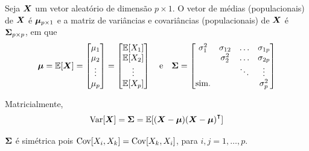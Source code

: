 \begin{definition}
	Seja $\bm{X}$ um vetor aleatório de dimensão $p\times 1$.
	O vetor de médias (populacionais) de $\bm{X}$ é $\bm{\mu}_{p\times 1}$ e a matriz de variâncias e covariâncias (populacionais) de $\bm{X}$ é $\mathbf{\Sigma}_{p\times p}$, em que
	\begin{equation}
		\bm{\mu} = \operatorname{\mathbb{E}}[\bm{X}] =
		\begin{bmatrix}
			\mu_1 \\
			\mu_2 \\
			\vdots \\
			\mu_p
		\end{bmatrix}
		=
		\begin{bmatrix}
			\operatorname{\mathbb{E}}[X_1] \\
			\operatorname{\mathbb{E}}[X_2] \\
			\vdots \\
			\operatorname{\mathbb{E}}[X_p]
		\end{bmatrix}
		\quad \text{e} \quad
		\mathbf{\Sigma} =
		\begin{bmatrix}
			\sigma_1^2 & \sigma_{12} & \ldots & \sigma_{1p} \\
			& \sigma_2^2 & \ldots & \sigma_{2p} \\
			& & \ddots & \vdots \\
			\text{sim.} & & & \sigma_p^2
		\end{bmatrix}
	\end{equation}
	
	Matricialmente,
	\begin{equation}
		\Var[\v{X}] = \m{\Sigma} = \E[(\v{X}-\v{\mu})(\v{X}-\v{\mu})\T]
	\end{equation}
	
	\begin{note}
		$\mathbf{\Sigma}$ é simétrica pois $\operatorname{Cov}[X_i,X_k] = \operatorname{Cov}[X_k,X_i]$, para $i,j=1,\ldots,p$.
	\end{note}
\end{definition}


